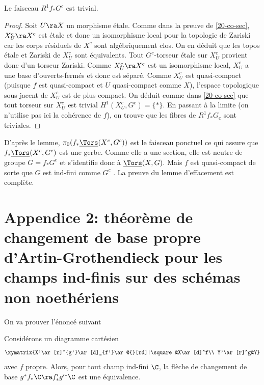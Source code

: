 \documentclass[10pt]{../fichiers-configuration-latex/smfart}
\begin{document}
\begin{lemme2} Le faisceau $R^1f_*G^c$ est trivial.\end{lemme2} \begin{proof} Soit $U\ra X$ un
morphisme étale. Comme dans la preuve de \ref{20-co-sec}, $X^c_U\ra X^c$ est étale et donc un
isomorphisme local pour la topologie de Zariski car les corps résiduels de $X^c$ sont algébriquement
clos. On en déduit que les topos étale et Zariski de $X^c_U$ sont équivalents. Tout $G^c$-torseur
étale sur $X_U^c$ provient donc d'un torseur Zariski.  Comme $X^c_U\ra X^c$ est un isomorphisme
local, $X_U^c$ a une base d'ouverts-fermés et donc est séparé. Comme $X^c_U$ est quasi-compact
(puisque $f$ est quasi-compact et $U$ quasi-compact comme $X$), l'espace topologique sous-jacent de
$X^c_U$ est de plus compact. On déduit comme dans \ref{20-co-sec} que tout torseur sur $X_U^c$ est
trivial $H^1(X_U^c,G^c)=\{*\}$. En passant à la limite (on n'utilise pas ici la cohérence de $f$),
on trouve que les fibres de $R^1f_*G_c$ sont triviales.\end{proof}


D'après le lemme, $\pi_0(f_*\underline{\Tors}(X^c,G^c))$ est le faisceau ponctuel ce qui assure que
$f_*\underline{\Tors}(X^c,G^c)$ est une gerbe. Comme elle a une section, elle est neutre de groupe
$G=f_*G^c$ et s'identifie donc à $\underline{\Tors}(X,G)$. Mais $f$ est quasi-compact de sorte que
$G$ est ind-fini comme $G^c$ . La preuve du lemme d'effacement est complète.


\section{Appendice 2: théorème de changement de base propre  d'Artin-Grothendieck pour les champs
ind-finis sur des schémas non noethériens}

On va prouver l'énoncé suivant

\begin{theoreme}\label{20-th-cgt-base-propre}Considérons un
diagramme cartésien $$\xymatrix{X'\ar[r]^{g'}\ar[d]_{f'}\ar@{}[rd]|\square&X\ar[d]^f\\
Y'\ar[r]^g&Y}$$ avec $f$ propre. Alors, pour tout champ ind-fini $\C$, la flèche de changement de
base $g^*f_*\C\ra f'_*g'^*\C$ est une équivalence.
\end{theoreme}
\end{document}
